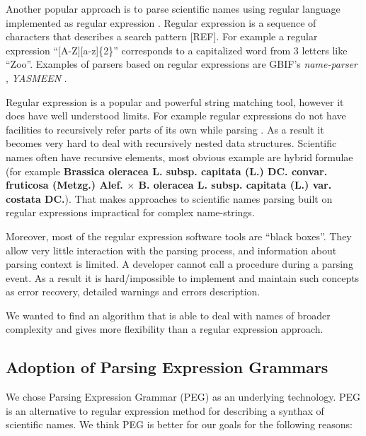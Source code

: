 \documentclass{bmcart}
\begin{document}
Another popular approach is to parse scientific names using regular language
implemented as regular expression \cite{aho1992foundations}. Regular expression
is a sequence of characters that describes a search pattern [REF].  For example
a regular expression ``[A-Z][a-z]\{2\}'' corresponds to a capitalized word from
3 letters like ``Zoo''. Examples of parsers based on regular expressions are
GBIF's \textit{name-parser} \cite{gbifNameParser}, \textit{YASMEEN}
\cite{VandenBerghe2015}.

Regular expression is a popular and powerful string matching tool, however it
does have well understood limits. For example regular expressions do not have
facilities to recursively refer parts of its own while parsing
\cite{yu1997handbook}. As a result it becomes very hard to deal with
recursively nested data structures.  Scientific names often have recursive
elements, most obvious example are hybrid formulae (for example
\textbf{Brassica oleracea L.  subsp.  capitata (L.) DC. convar. fruticosa
  (Metzg.) Alef.  $\times$ B. oleracea L. subsp. capitata (L.) var.  costata
DC.}). That makes approaches to scientific names parsing built on regular
expressions impractical for complex name-strings.

Moreover, most of the regular expression software tools are ``black boxes''.
They allow very little interaction with the parsing process, and information
about parsing context is limited. A developer cannot call a procedure during a
parsing event. As a result it is hard/impossible to implement and maintain such
concepts as error recovery, detailed warnings and errors description.

We wanted to find an algorithm that is able to deal with names of broader
complexity and gives more flexibility than a regular expression approach.

\subsection*{Adoption of Parsing Expression Grammars}

We chose Parsing Expression Grammar (PEG) \cite{Ford2004} as an underlying
technology. PEG is an alternative to regular expression method for describing a
synthax of scientific names. We think PEG is better for our goals for the
following reasons:
\end{document}
